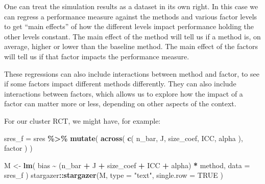 \documentclass[
]{book}
\newenvironment{Shaded}{\begin{snugshade}}{\end{snugshade}}
\newcommand{\AttributeTok}[1]{\textcolor[rgb]{0.13,0.29,0.53}{#1}}
\newcommand{\ConstantTok}[1]{\textcolor[rgb]{0.56,0.35,0.01}{#1}}
\newcommand{\FunctionTok}[1]{\textcolor[rgb]{0.13,0.29,0.53}{\textbf{#1}}}
\newcommand{\NormalTok}[1]{#1}
\newcommand{\OtherTok}[1]{\textcolor[rgb]{0.56,0.35,0.01}{#1}}
\newcommand{\SpecialCharTok}[1]{\textcolor[rgb]{0.81,0.36,0.00}{\textbf{#1}}}
\newcommand{\StringTok}[1]{\textcolor[rgb]{0.31,0.60,0.02}{#1}}
\begin{document}
One can treat the simulation results as a dataset in its own right.
In this case we can regress a performance measure against the methods and various factor levels to get ``main effects'' of how the different levels impact performance holding the other levels constant.
The main effect of the method will tell us if a method is, on average, higher or lower than the baseline method.
The main effect of the factors will tell us if that factor impacts the performance measure.

These regressions can also include interactions between method and factor, to see if some factors impact different methods differently.
They can also include interactions between factors, which allows us to explore how the impact of a factor can matter more or less, depending on other aspects of the context.

For our cluster RCT, we might have, for example:

\begin{Shaded}
\begin{Highlighting}[]
\NormalTok{sres\_f }\OtherTok{=}\NormalTok{ sres }\SpecialCharTok{\%\textgreater{}\%}
  \FunctionTok{mutate}\NormalTok{( }\FunctionTok{across}\NormalTok{( }\FunctionTok{c}\NormalTok{( n\_bar, J, size\_coef, ICC, alpha ), factor ) )}

\NormalTok{M }\OtherTok{\textless{}{-}} \FunctionTok{lm}\NormalTok{( bias }\SpecialCharTok{\textasciitilde{}}\NormalTok{ (n\_bar }\SpecialCharTok{+}\NormalTok{ J }\SpecialCharTok{+}\NormalTok{ size\_coef }\SpecialCharTok{+}\NormalTok{ ICC }\SpecialCharTok{+}\NormalTok{ alpha) }\SpecialCharTok{*}\NormalTok{ method, }
         \AttributeTok{data =}\NormalTok{ sres\_f )}
\NormalTok{stargazer}\SpecialCharTok{::}\FunctionTok{stargazer}\NormalTok{(M, }\AttributeTok{type =} \StringTok{"text"}\NormalTok{,}
                     \AttributeTok{single.row =} \ConstantTok{TRUE}\NormalTok{ )}
\end{Highlighting}
\end{Shaded}
\end{document}
